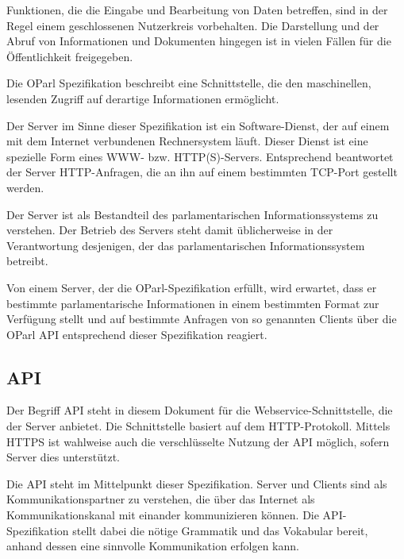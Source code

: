 \documentclass[,a4paper]{article}
\begin{document}
Funktionen, die die Eingabe und Bearbeitung von Daten betreffen, sind in
der Regel einem geschlossenen Nutzerkreis vorbehalten. Die Darstellung
und der Abruf von Informationen und Dokumenten hingegen ist in vielen
Fällen für die Öffentlichkeit freigegeben.

Die OParl Spezifikation beschreibt eine Schnittstelle, die den
maschinellen, lesenden Zugriff auf derartige Informationen ermöglicht.


Der Server im Sinne dieser Spezifikation ist ein Software-Dienst, der
auf einem mit dem Internet verbundenen Rechnersystem läuft. Dieser
Dienst ist eine spezielle Form eines WWW- bzw. HTTP(S)-Servers.
Entsprechend beantwortet der Server HTTP-Anfragen, die an ihn auf einem
bestimmten TCP-Port gestellt werden.

Der Server ist als Bestandteil des parlamentarischen Informationssystems
zu verstehen. Der Betrieb des Servers steht damit üblicherweise in der
Verantwortung desjenigen, der das parlamentarischen Informationssystem
betreibt.

Von einem Server, der die OParl-Spezifikation erfüllt, wird erwartet,
dass er bestimmte parlamentarische Informationen in einem bestimmten
Format zur Verfügung stellt und auf bestimmte Anfragen von so genannten
Clients über die OParl API entsprechend dieser Spezifikation reagiert.

\subsection{API}\label{api}

Der Begriff API steht in diesem Dokument für die
Webservice-Schnittstelle, die der Server anbietet. Die Schnittstelle
basiert auf dem HTTP-Protokoll. Mittels HTTPS ist wahlweise auch die
verschlüsselte Nutzung der API möglich, sofern Server dies unterstützt.

Die API steht im Mittelpunkt dieser Spezifikation. Server und Clients
sind als Kommunikationspartner zu verstehen, die über das Internet als
Kommunikationskanal mit einander kommunizieren können. Die
API-Spezifikation stellt dabei die nötige Grammatik und das Vokabular
bereit, anhand dessen eine sinnvolle Kommunikation erfolgen kann.

\end{document}
